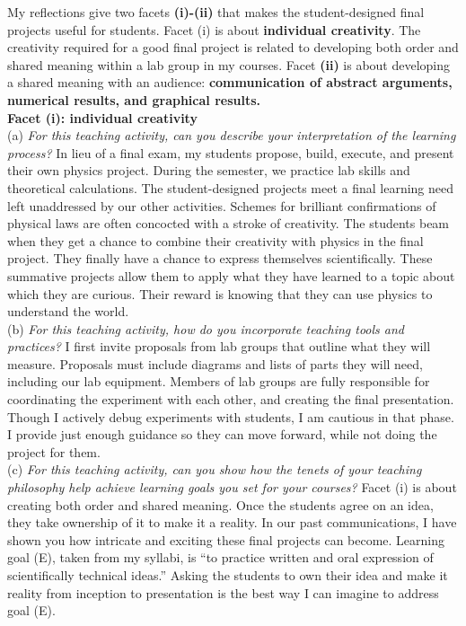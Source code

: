 \documentclass[../../../main.tex]{subfiles}
\begin{document}
My reflections give two facets \textbf{(i)-(ii)} that makes the student-designed final projects useful for students.  Facet (i) is about \textbf{individual creativity}.  The creativity required for a good final project is related to developing both order and shared meaning within a lab group in my courses.  Facet \textbf{(ii)} is about developing a shared meaning with an audience: \textbf{communication of abstract arguments, numerical results, and graphical results.}
\\
\vspace{0.15cm}
\textbf{Facet (i): individual creativity}
\\
\vspace{0.15cm}
(a) \textit{For this teaching activity, can you describe your interpretation of the learning process?} In lieu of a final exam, my students propose, build, execute, and present their own physics project.  During the semester, we practice lab skills and theoretical calculations.  The student-designed projects meet a final learning need left unaddressed by our other activities.  Schemes for brilliant confirmations of physical laws are often concocted with a stroke of creativity.  The students beam when they get a chance to combine their creativity with physics in the final project.  They finally have a chance to express themselves scientifically.  These summative projects allow them to apply what they have learned to a topic about which they are curious.  Their reward is knowing that they can use physics to understand the world. 
\\
\vspace{0.15cm}
(b) \textit{For this teaching activity, how do you incorporate teaching tools and practices?}  I first invite proposals from lab groups that outline what they will measure.  Proposals must include diagrams and lists of parts they will need, including our lab equipment.  Members of lab groups are fully responsible for coordinating the experiment with each other, and creating the final presentation.  Though I actively debug experiments with students, I am cautious in that phase. I provide just enough guidance so they can move forward, while not doing the project for them.
\\
\vspace{0.15cm}
(c) \textit{For this teaching activity, can you show how the tenets of your teaching philosophy help achieve learning goals you set for your courses?} Facet (i) is about creating both order and shared meaning.  Once the students agree on an idea, they take ownership of it to make it a reality.  In our past communications, I have shown you how intricate and exciting these final projects can become.  Learning goal (E), taken from my syllabi, is ``to practice written and oral expression of scientifically technical ideas.''  Asking the students to own their idea and make it reality from inception to presentation is the best way I can imagine to address goal (E).
\end{document}
